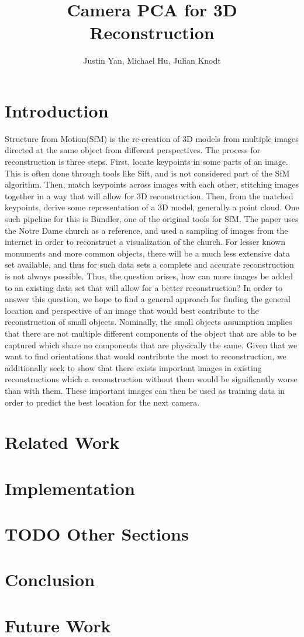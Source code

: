 \documentclass[11pt]{extarticle}
\title{Camera PCA for 3D Reconstruction \vspace{-1ex}}
\author{Justin Yan, Michael Hu, Julian Knodt}
\date{}
\begin{document}
\maketitle


\section*{Introduction}

Structure from Motion(SfM) is the re-creation of 3D models from multiple images directed at the
same object from different perspectives. The process for reconstruction is three steps. First,
locate keypoints in some parts of an image. This is often done through tools like Sift, and is
not considered part of the SfM algorithm. Then, match keypoints across images with each other,
stitching images together in a way that will allow for 3D reconstruction. Then, from the matched
keypoints, derive some representation of a 3D model, generally a point cloud. One such pipeline
for this is Bundler\cite{2006Szeliski}, one of the original tools for SfM. The paper uses the
Notre Dame church as a reference, and used a sampling of images from the internet in order to
reconstruct a visualization of the church. For lesser known monuments and more common objects,
there will be a much less extensive data set available, and thus for such data sets a complete
and accurate reconstruction is not always possible. Thus, the question arises, how can more
images be added to an existing data set that will allow for a better reconstruction? In order to
answer this question, we hope to find a general approach for finding the general location and
perspective of an image that would best contribute to the reconstruction of small objects.
Nominally, the small objects assumption implies that there are not multiple different components
of the object that are able to be captured which share no components that are physically the
same. Given that we want to find orientations that would contribute the most to reconstruction,
we additionally seek to show that there exists important images in existing reconstructions which
a reconstruction without them would be significantly worse than with them. These important
images can then be used as training data in order to predict the best location for the next
camera.
\section*{Related Work}
\section*{Implementation}
\section*{TODO Other Sections}
\section*{Conclusion}
\section*{Future Work}



\nocite{*}

\end{document}
